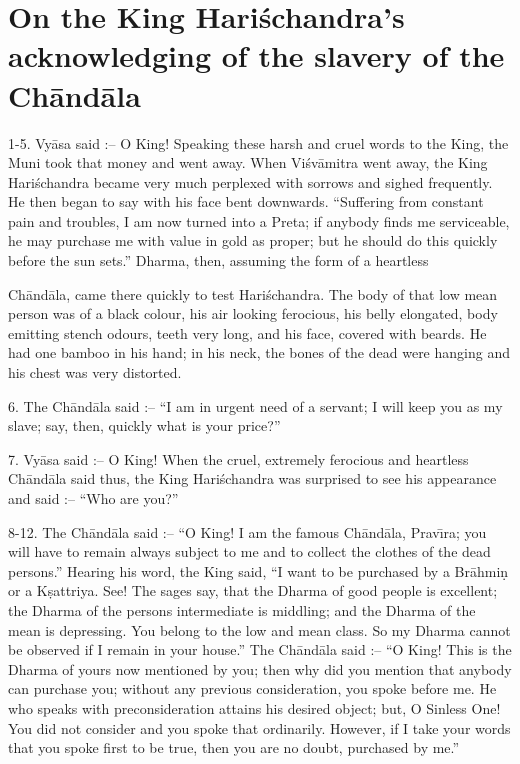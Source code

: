 \chapter{On the King Hari\'schandra's acknowledging of the slavery of the Ch\=and\=ala}

1-5. Vy\=asa said :-- O King! Speaking these harsh and cruel words to the King, the Muni took that money and went away. When Vi\'sv\=amitra went away, the King Hari\'schandra became very much perplexed with sorrows and sighed frequently. He then began to say with his face bent downwards. ``Suffering from constant pain and troubles, I am now turned into a Preta; if anybody finds me serviceable, he may purchase me with value in gold as proper; but he should do this quickly before the sun sets.'' Dharma, then, assuming the form of a heartless

Ch\=and\=ala, came there quickly to test Hari\'schandra. The body of that low mean person was of a black colour, his air looking ferocious, his belly elongated, body emitting stench odours, teeth very long, and his face, covered with beards. He had one bamboo in his hand; in his neck, the bones of the dead were hanging and his chest was very distorted.

6. The Ch\=and\=ala said :-- ``I am in urgent need of a servant; I will keep you as my slave; say, then, quickly what is your price?''

7. Vy\=asa said :-- O King! When the cruel, extremely ferocious and heartless Ch\=and\=ala said thus, the King Hari\'schandra was surprised to see his appearance and said :-- ``Who are you?''

8-12. The Ch\=and\=ala said :-- ``O King! I am the famous Ch\=and\=ala, Prav\={\i}ra; you will have to remain always subject to me and to collect the clothes of the dead persons.'' Hearing his word, the King said, ``I want to be purchased by a Br\=ahmi\d{n} or a K\d{s}attriya. See! The sages say, that the Dharma of good people is excellent; the Dharma of the persons intermediate is middling; and the Dharma of the mean is depressing. You belong to the low and mean class. So my Dharma cannot be observed if I remain in your house.'' The Ch\=and\=ala said :-- ``O King! This is the Dharma of yours now mentioned by you; then why did you mention that anybody can purchase you; without any previous consideration, you spoke before me. He who speaks with preconsideration attains his desired object; but, O Sinless One! You did not consider and you spoke that ordinarily. However, if I take your words that you spoke first to be true, then you are no doubt, purchased by me.''


